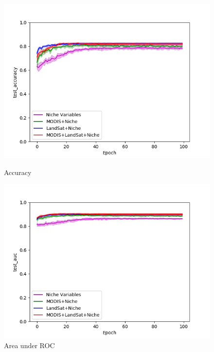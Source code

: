 \def\year{2017}\relax \documentclass[letterpaper]{article}
\begin{document}
\begin{figure}
\centering
\begin{minipage}{.24\textwidth}
  \centering
\includegraphics[width=\textwidth]{pics/test_accuracy_mean_variables.png}
\caption{Accuracy}\label{fig:subsetacc}
\end{minipage}
\begin{minipage}{.01\textwidth}
\end{minipage}
\begin{minipage}{.24\textwidth}
  \centering
\includegraphics[width=\textwidth]{pics/test_auc_mean_variables.png}
\caption{Area under ROC}\label{fig:subsetauc}
\end{minipage}
\begin{minipage}{.24\textwidth}

\end{minipage}
\end{figure}
\end{document}
